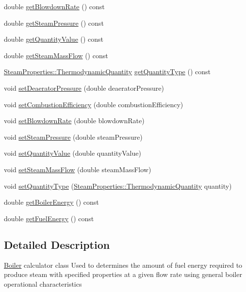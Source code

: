 \begin{DoxyCompactItemize}
\item 
double \hyperlink{class_boiler_aec9bf6eeed82d8d5f35284c65a3986e7}{get\+Blowdown\+Rate} () const
\item 
double \hyperlink{class_boiler_a99d4bbace6ef20bcbdc4b0cfcdc43213}{get\+Steam\+Pressure} () const
\item 
double \hyperlink{class_boiler_a78370a174135e6cc95abcd3b7ac2f947}{get\+Quantity\+Value} () const
\item 
double \hyperlink{class_boiler_a4101e71234995558a451dcab145b5fc9}{get\+Steam\+Mass\+Flow} () const
\item 
\hyperlink{class_steam_properties_ae0294bedf7d178c2d8fb6aed0f62fbff}{Steam\+Properties\+::\+Thermodynamic\+Quantity} \hyperlink{class_boiler_a26a71f789c9f9e05bd43a1ca0219f920}{get\+Quantity\+Type} () const
\item 
void \hyperlink{class_boiler_a56f422254606ebba1248ae0b4f8f0215}{set\+Deaerator\+Pressure} (double deaerator\+Pressure)
\item 
void \hyperlink{class_boiler_abef6bc48101f98f0650cb07fb1d51f74}{set\+Combustion\+Efficiency} (double combustion\+Efficiency)
\item 
void \hyperlink{class_boiler_a66c0e4c577dbd3f52dcf202e69a08371}{set\+Blowdown\+Rate} (double blowdown\+Rate)
\item 
void \hyperlink{class_boiler_a0a4619ff73c9969daebe3aa66ddad6be}{set\+Steam\+Pressure} (double steam\+Pressure)
\item 
void \hyperlink{class_boiler_ac3450d88dba124529d59baf62c39e14a}{set\+Quantity\+Value} (double quantity\+Value)
\item 
void \hyperlink{class_boiler_ada7af5896a2a4701d78a532dc9bc9892}{set\+Steam\+Mass\+Flow} (double steam\+Mass\+Flow)
\item 
void \hyperlink{class_boiler_a9c5b20cae6133c9174b12760f36d52c2}{set\+Quantity\+Type} (\hyperlink{class_steam_properties_ae0294bedf7d178c2d8fb6aed0f62fbff}{Steam\+Properties\+::\+Thermodynamic\+Quantity} quantity)
\item 
double \hyperlink{class_boiler_a8cc9ad5f1b36f5dcbcb225e9e3d13a39}{get\+Boiler\+Energy} () const
\item 
double \hyperlink{class_boiler_a55542a761669c842163b20932f9747d3}{get\+Fuel\+Energy} () const
\end{DoxyCompactItemize}


\subsection{Detailed Description}
\hyperlink{class_boiler}{Boiler} calculator class Used to determines the amount of fuel energy required to produce steam with specified properties at a given flow rate using general boiler operational characteristics 

